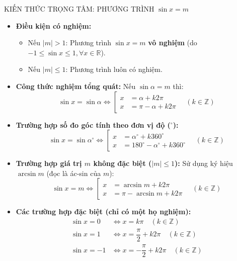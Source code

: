 \documentclass[12pt, a4paper]{article}
\begin{document}
\begin{pedabox}{KIẾN THỨC TRỌNG TÂM: PHƯƠNG TRÌNH $\sin x = m$}  
\begin{itemize}[leftmargin=0.6cm]  
    \item \textbf{Điều kiện có nghiệm:}  
    \begin{itemize}  
        \item Nếu $|m| > 1$: Phương trình $\sin x = m$ \textbf{vô nghiệm} (do $-1 \le \sin x \le 1, \forall x \in \mathbb{R}$).  
        \item Nếu $|m| \le 1$: Phương trình luôn có nghiệm.  
    \end{itemize}  
    \item \textbf{Công thức nghiệm tổng quát:}  
    Nếu $\sin\alpha = m$ thì:  
    $$\sin x = \sin\alpha \iff \left[\begin{aligned} x &= \alpha + k2\pi \\ x &= \pi - \alpha + k2\pi \end{aligned}\right. \quad (k \in \mathbb{Z})$$  
    \item \textbf{Trường hợp số đo góc tính theo đơn vị độ ($^\circ$):}  
    $$\sin x = \sin\alpha^\circ \iff \left[\begin{aligned} x &= \alpha^\circ + k360^\circ \\ x &= 180^\circ - \alpha^\circ + k360^\circ \end{aligned}\right. \quad (k \in \mathbb{Z})$$  
    \item \textbf{Trường hợp giá trị $m$ không đặc biệt ($|m| \le 1$):}  
    Sử dụng ký hiệu $\arcsin m$ (đọc là ác-sin của $m$):  
    $$\sin x = m \iff \left[\begin{aligned} x &= \arcsin m + k2\pi \\ x &= \pi - \arcsin m + k2\pi \end{aligned}\right. \quad (k \in \mathbb{Z})$$  
    \item \textbf{Các trường hợp đặc biệt (chỉ có một họ nghiệm):}  
    \begin{align*}  
        \sin x = 0 &\iff x = k\pi \quad (k \in \mathbb{Z}) \\  
        \sin x = 1 &\iff x = \dfrac{\pi}{2} + k2\pi \quad (k \in \mathbb{Z}) \\  
        \sin x = -1 &\iff x = -\dfrac{\pi}{2} + k2\pi \quad (k \in \mathbb{Z})  
    \end{align*}  
\end{itemize}  
\end{pedabox}  
  
\end{document}
